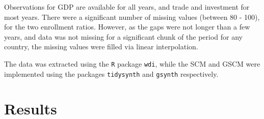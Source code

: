 \documentclass[12pt,nobind, a4paper]{reedthesis}
\begin{document}
 Observations for GDP are available for all years, and trade and investment for most years. There were a significant number of missing values (between 80 - 100), for the two enrollment ratios. However, as the gaps were not longer than a few years, and data was not missing for a significant chunk of the period for any country, the missing values were filled via linear interpolation.
 \linebreak

 The data was extracted using the \texttt{R} package \texttt{wdi}, while the SCM and GSCM were implemented using the packages \texttt{tidysynth} and \texttt{gsynth} respectively.

 \hypertarget{res}{%
 \section{Results}\label{res}}
\end{document}
